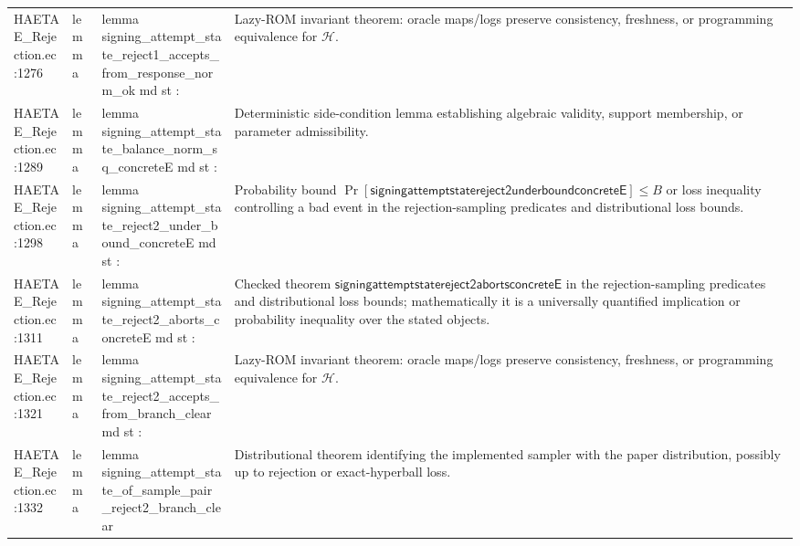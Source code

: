 \documentclass[10pt]{article}
\begin{document}
\begin{longtable}{L{0.11\textwidth}L{0.055\textwidth}L{0.385\textwidth}L{0.41\textwidth}}
HAETAE\_\allowbreak{}Rejection.\allowbreak{}ec:\allowbreak{}1276 & lemma & {\ttfamily\scriptsize lemma signing\_\allowbreak{}attempt\_\allowbreak{}state\_\allowbreak{}reject1\_\allowbreak{}accepts\_\allowbreak{}from\_\allowbreak{}response\_\allowbreak{}norm\_\allowbreak{}ok md st :} & Lazy-ROM invariant theorem: oracle maps/logs preserve consistency, freshness, or programming equivalence for $\mathcal H$. \\
HAETAE\_\allowbreak{}Rejection.\allowbreak{}ec:\allowbreak{}1289 & lemma & {\ttfamily\scriptsize lemma signing\_\allowbreak{}attempt\_\allowbreak{}state\_\allowbreak{}balance\_\allowbreak{}norm\_\allowbreak{}sq\_\allowbreak{}concreteE md st :} & Deterministic side-condition lemma establishing algebraic validity, support membership, or parameter admissibility. \\
HAETAE\_\allowbreak{}Rejection.\allowbreak{}ec:\allowbreak{}1298 & lemma & {\ttfamily\scriptsize lemma signing\_\allowbreak{}attempt\_\allowbreak{}state\_\allowbreak{}reject2\_\allowbreak{}under\_\allowbreak{}bound\_\allowbreak{}concreteE md st :} & Probability bound $\Pr[\mathsf{signingattemptstatereject2underboundconcreteE}]\le B$ or loss inequality controlling a bad event in the rejection-sampling predicates and distributional loss bounds. \\
HAETAE\_\allowbreak{}Rejection.\allowbreak{}ec:\allowbreak{}1311 & lemma & {\ttfamily\scriptsize lemma signing\_\allowbreak{}attempt\_\allowbreak{}state\_\allowbreak{}reject2\_\allowbreak{}aborts\_\allowbreak{}concreteE md st :} & Checked theorem $\mathsf{signingattemptstatereject2abortsconcreteE}$ in the rejection-sampling predicates and distributional loss bounds; mathematically it is a universally quantified implication or probability inequality over the stated objects. \\
HAETAE\_\allowbreak{}Rejection.\allowbreak{}ec:\allowbreak{}1321 & lemma & {\ttfamily\scriptsize lemma signing\_\allowbreak{}attempt\_\allowbreak{}state\_\allowbreak{}reject2\_\allowbreak{}accepts\_\allowbreak{}from\_\allowbreak{}branch\_\allowbreak{}clear md st :} & Lazy-ROM invariant theorem: oracle maps/logs preserve consistency, freshness, or programming equivalence for $\mathcal H$. \\
HAETAE\_\allowbreak{}Rejection.\allowbreak{}ec:\allowbreak{}1332 & lemma & {\ttfamily\scriptsize lemma signing\_\allowbreak{}attempt\_\allowbreak{}state\_\allowbreak{}of\_\allowbreak{}sample\_\allowbreak{}pair\_\allowbreak{}reject2\_\allowbreak{}branch\_\allowbreak{}clear} & Distributional theorem identifying the implemented sampler with the paper distribution, possibly up to rejection or exact-hyperball loss. \\

\end{longtable}
\end{document}
